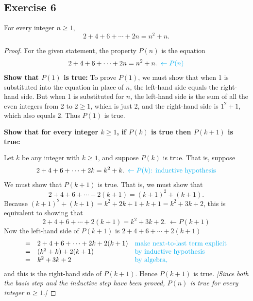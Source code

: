 \documentclass[14pt]{extarticle}
\newcommand{\from}{\leftarrow}
\newcommand{\cy}{\color{cyan}}
\begin{document}
\subsection{Exercise 6}
For every integer $n \geq 1$,
\[
2 + 4 + 6 + \cdots + 2n = n^2 + n.
\]
\begin{proof}
For the given statement, the property $P(n)$ is the equation
\[
2 + 4 + 6 + \cdots + 2n = n^2 + n. \,\,\, {\cy \from P(n)}
\]
{\bf Show that $P(1)$ is true:} To prove $P(1)$, we must show that when 1 is substituted into the equation in place of $n$, the left-hand side equals the right-hand side. But when 1 is substituted for $n$, the left-hand side is the sum of all the even integers from 2 to $2 \geq 1$, which is just 2, and the right-hand side is $1^2 + 1$, which also equals 2. Thus $P(1)$ is true.

{\bf Show that for every integer $k \geq 1$, if $P(k)$ is true then $P(k + 1)$ is true:}

Let $k$ be any integer with $k \geq 1$, and suppose $P(k)$ is true. That is, suppose
\[
2 + 4 + 6 + \cdots + 2k = k^2 + k. \,\,\, {\cy \from P(k) \text{: inductive hypothesis}}
\]
We must show that $P(k + 1)$ is true. That is, we must show that
\[
2 + 4 + 6 + \cdots + 2(k + 1) = (k + 1)^2 + (k + 1).
\]
Because $(k + 1)^2 + (k + 1) = k^2 + 2k + 1 + k + 1 =
k^2 + 3k + 2$, this is equivalent to showing that
\[
2 + 4 + 6 + \cdots + 2(k + 1) = k^2 + 3k + 2. \,\, \from P(k + 1)
\]
Now the left-hand side of $P(k + 1)$ is $2 + 4 + 6 + \cdots + 2(k + 1)$
\[
\begin{array}{lll}
= & 2 + 4 + 6 + \cdots + 2k + 2(k + 1) & \text{\cy make next-to-last term explicit} \\
= & (k^2+k) + 2(k+1) & \text{\cy by inductive hypothesis} \\
= & k^2 + 3k + 2 & \text{\cy by algebra,} 
\end{array}
\]
and this is the right-hand side of $P(k + 1)$. Hence $P(k + 1)$ is true. {\it [Since both the basis step and the inductive step have been proved, $P(n)$ is true for every integer $n \geq 1$.]}
\end{proof}
\end{document}
